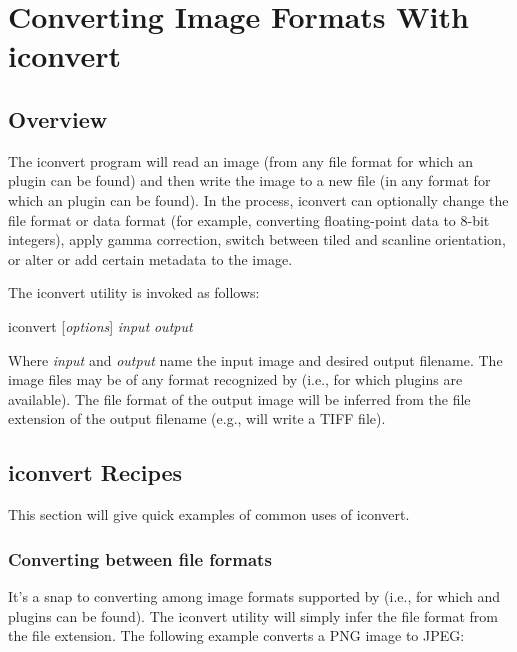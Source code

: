 \chapter{Converting Image Formats With {\kw iconvert}}
\label{chap:iconvert}

\section{Overview}

The {\cf iconvert} program will read an image (from any file format for
which an \ImageInput plugin can be found) and then write the image to a
new file (in any format for which an \ImageOutput plugin can be found).
In the process, {\cf iconvert} can optionally change the file format or
data format (for example, converting floating-point data to 8-bit
integers), apply gamma correction, switch between tiled and scanline
orientation, or alter or add certain metadata to the image.

The {\cf iconvert} utility is invoked as follows:

\medskip

\hspace{0.25in} {\cf iconvert} [\emph{options}] \emph{input} \emph{output}

\medskip

Where \emph{input} and \emph{output} name the input image and desired
output filename.  The image files may be of any format recognized by
\product (i.e., for which \ImageInput plugins are available).  The file
format of the output image will be inferred from the file extension of
the output filename (e.g.,  will write a TIFF file).


\section{{\cf iconvert} Recipes}

This section will give quick examples of common uses of {\cf iconvert}.

\subsection*{Converting between file formats}

It's a snap to converting among image formats supported by \product
(i.e., for which \ImageInput and \ImageOutput plugins can be found).
The {\cf iconvert} utility will simply infer the file format from the
file extension. The following example converts a PNG image to JPEG:

